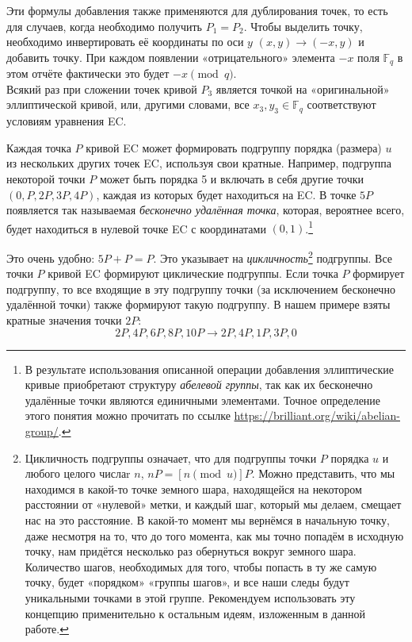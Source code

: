 Эти формулы добавления также применяются для дублирования точек, то есть для случаев, когда необходимо получить \(P_1 = P_2\). Чтобы выделить точку, необходимо инвертировать её координаты по оси $y$ $(x,y) \rightarrow (-x,y)$ \cite{Bernstein2008} и добавить точку. При каждом появлении «отрицательного» элемента $-x$ поля $\mathbb{F}_q$ в этом отчёте фактически это будет $-x \pmod{q}$.
\\

Всякий раз при сложении точек кривой $P_3$ является точкой на «оригинальной» эллиптической кривой, или, другими словами, все $x_3,y_3 \in \mathbb{F}_q$ соответствуют условиям уравнения EC.

Каждая точка $P$ кривой EC может формировать подгруппу порядка (размера) $u$ из несколь\-ких других точек EC, используя свои кратные. Например, подгруппа некоторой точки $P$ может быть порядка 5 и включать в себя другие точки $(0, P, 2P, 3P, 4P)$, каждая из которых будет находиться на EC. В точке $5P$ появляется так называемая {\em бесконечно удалённая точка}, которая, вероятнее всего, будет находиться в нулевой точке EC с координатами $(0, 1)$.\footnote{В результате использования описанной операции добавления эллиптические кривые приобретают структуру {\em абелевой группы}, так как их бесконечно удалённые точки являются единичными элементами. Точное определение этого понятия можно прочитать по ссылке \url{https://brilliant.org/wiki/abelian-group/}.}

Это очень удобно: $5P + P = P$. Это указывает на {\em цикличность}\footnote{\label{cyclical_note}Цикличность подгруппы означает, что для подгруппы точки $P$ порядка $u$ и любого целого числаr $n$, $n P = [n \pmod{u}] P$. Можно представить, что мы находимся в какой-то точке земного шара, находящейся на некотором расстоянии от «нулевой» метки, и каждый шаг, который мы делаем, смещает нас на это расстояние. В какой-то момент мы вернёмся в начальную точку, даже несмотря на то, что до того момента, как мы точно попадём в исходную точку, нам придётся несколько раз обернуться вокруг земного шара. Количество шагов, необходимых для того, чтобы попасть в ту же самую точку, будет «порядком» «группы шагов», и все наши следы будут уникальными точками в этой группе. Рекомендуем использовать эту концепцию применительно к остальным идеям, изложенным в данной работе.} подгруппы. Все точки $P$ кривой EC формируют циклические подгруппы. Если точка $P$ формирует подгруппу, то все входящие в эту подгруппу точки (за исключением бесконечно удалённой точки) также формируют такую подгруппу. В нашем примере взяты кратные значения точки $2P$:\vspace{.175cm}
\[2P, 4P, 6P, 8P, 10P \rightarrow 2P, 4P, 1P, 3P, 0\]

